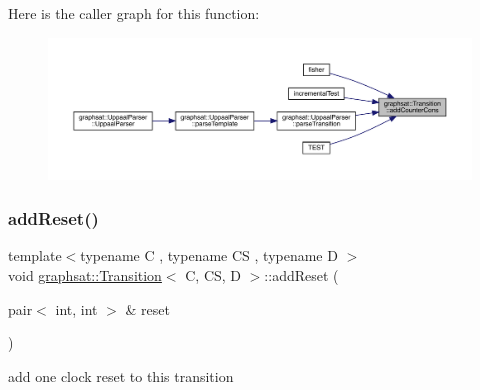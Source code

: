 Here is the caller graph for this function\+:
\nopagebreak
\begin{figure}[H]
\begin{center}
\leavevmode
\includegraphics[width=350pt]{classgraphsat_1_1_transition_af5e1f394f7a4c0bcdf416d28b8b8f9fb_icgraph}
\end{center}
\end{figure}
\mbox{\label{classgraphsat_1_1_transition_ad406304a7c8d3ffad38c0f1578ef6e31}} 
\subsubsection{\texorpdfstring{addReset()}{addReset()}}
{\footnotesize\ttfamily template$<$typename C , typename CS , typename D $>$ \\
void \mbox{\hyperlink{classgraphsat_1_1_transition}{graphsat\+::\+Transition}}$<$ C, CS, D $>$\+::add\+Reset (\begin{DoxyParamCaption}\item[{pair$<$ int, int $>$ \&}]{reset }\end{DoxyParamCaption})\hspace{0.3cm}{\ttfamily [inline]}}

add one clock reset to this transition



